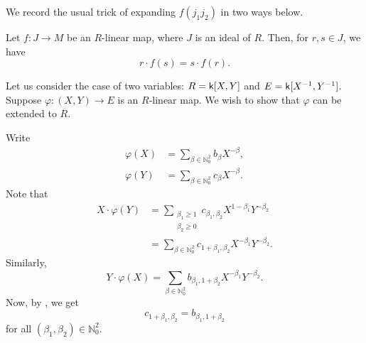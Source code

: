 We record the usual trick of expanding $f(j_{1} j_{2})$ in two ways below.

\begin{prop} \label{prop:compatibility}
	Let $f : J \to M$ be an $R$-linear map, where $J$ is an ideal of $R$. Then, for $r, s \in J$, we have
	\begin{equation} \tag{CC} \label{eq:compatibility}
		r \cdot f(s) = s \cdot f(r).
	\end{equation}
\end{prop}

\begin{obs}
	Let us consider the case of two variables: $R = \mathsf{k}[X, Y]$ and $E = \mathsf{k}[X^{-1}, Y^{-1}]$. Suppose $\varphi : (X, Y) \to E$ is an $R$-linear map. We wish to show that $\varphi$ can be extended to $R$. 

	Write
	\begin{align*} 
		\varphi(X) &= \sum_{\beta \in \mathbb{N}_{0}^{2}} b_{\beta} X^{-\beta}, \\
		\varphi(Y) &= \sum_{\beta \in \mathbb{N}_{0}^{2}} c_{\beta} X^{-\beta}.
	\end{align*}
	Note that
	\begin{align*} 
		X \cdot \varphi(Y) &= \sum_{\substack{\beta_{1} \ge 1 \\ \beta_{2} \ge 0}} c_{\beta_{1}, \beta_{2}} X^{1 - \beta_{1}} Y^{-\beta_{2}} \\
		&= \sum_{\beta \in \mathbb{N}_{0}^{2}} c_{1 + \beta_{1}, \beta_{2}} X^{-\beta_{1}} Y^{-\beta_{2}}.
	\end{align*}
	Similarly,
	\begin{equation*} 
		Y \cdot \varphi(X) = \sum_{\beta \in \mathbb{N}_{0}^{2}} b_{\beta_{1}, 1 + \beta_{2}} X^{-\beta_{1}} Y^{-\beta_{2}}.
	\end{equation*}
	Now, by , we get
	\begin{equation*} 
		c_{1 + \beta_{1}, \beta_{2}} = b_{\beta_{1}, 1 + \beta_{2}}
	\end{equation*}
	for all $(\beta_{1}, \beta_{2}) \in \mathbb{N}_{0}^{2}$.


\end{obs}
